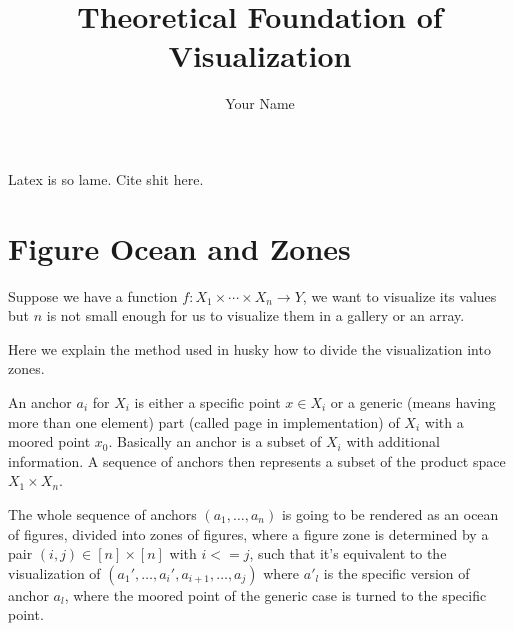 \documentclass{article}
\title{Theoretical Foundation of Visualization}
\author{Your Name}
\date{}
\begin{document}
\maketitle

Latex is so lame. Cite shit \cite{someAuthor2023}here.

\section{Figure Ocean and Zones}

Suppose we have a function $f:X_1\times\cdots\times X_n\rightarrow Y$, we want to visualize its values but $n$ is not small enough for us to visualize them in a gallery or an array.

Here we explain the method used in husky how to divide the visualization into zones.

An anchor $a_i$ for $X_i$ is either a specific point $x\in X_i$ or a generic (means having more than one element) part (called page in implementation) of $X_i$ with a moored point $x_0$. Basically an anchor is a subset of $X_i$ with additional information. A sequence of anchors then represents a subset of the product space $X_1\times X_n$.

The whole sequence of anchors $(a_1,\ldots,a_n)$ is going to be rendered as an ocean of figures, divided into zones of figures, where a figure zone is determined by a pair $(i,j)\in [n]\times[n]$ with $i<=j$, such that it's equivalent to the visualization of $(a_1',\ldots,a_i',a_{i+1},\ldots,a_j)$ where $a'_l$ is the specific version of anchor $a_l$, where the moored point of the generic case is turned to the specific point.

\end{document}
